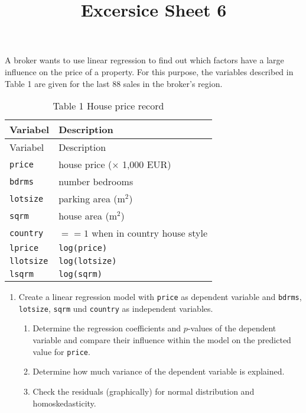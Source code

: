 \documentclass[11pt,]{article}
\title{Excersice Sheet 6}
\author{}
\date{}
\providecommand{\tightlist}{%
  \setlength{\itemsep}{0pt}\setlength{\parskip}{0pt}}
\begin{document}
\maketitle

\captionsetup[table]{labelformat=empty}

A broker wants to use linear regression to find out which factors have a
large influence on the price of a property. For this purpose, the
variables described in Table 1 are given for the last 88 sales in the
broker's region.

\begin{longtable}[]{@{}ll@{}}
\caption{Table 1 House price record}\tabularnewline
\toprule
Variabel & Description\tabularnewline
\midrule
\endfirsthead
\toprule
Variabel & Description\tabularnewline
\midrule
\endhead
\texttt{price} & house price (\(\times\) 1,000 EUR)\tabularnewline
\texttt{bdrms} & number bedrooms\tabularnewline
\texttt{lotsize} & parking area (m\(^2\))\tabularnewline
\texttt{sqrm} & house area (m\(^2\))\tabularnewline
\texttt{country} & \(==1\) when in country house style\tabularnewline
\texttt{lprice} & \texttt{log(price)}\tabularnewline
\texttt{llotsize} & \texttt{log(lotsize)}\tabularnewline
\texttt{lsqrm} & \texttt{log(sqrm)}\tabularnewline
\bottomrule
\end{longtable}

\begin{enumerate}
\def\labelenumi{\arabic{enumi}.}
\tightlist
\item
  Create a linear regression model with \texttt{price} as dependent
  variable and \texttt{bdrms}, \texttt{lotsize}, \texttt{sqrm} und
  \texttt{country} as independent variables.

  \begin{enumerate}
  \def\labelenumii{\alph{enumii})}
  \tightlist
  \item
    Determine the regression coefficients and \(p\)-values of the
    dependent variable and compare their influence within the model on
    the predicted value for \texttt{price}.
  \item
    Determine how much variance of the dependent variable is explained.
  \item
    Check the residuals (graphically) for normal distribution and
    homoskedasticity.
  \end{enumerate}
\end{enumerate}
\end{document}
